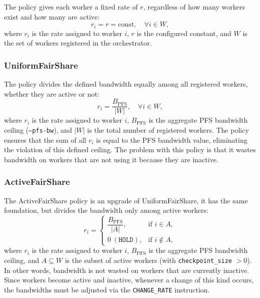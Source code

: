 \documentclass[sigplan,twocolumn,10pt,nonacm]{acmart}
\begin{document}
The policy gives each worker a fixed rate of $r$, regardless of how many workers exist and how many are active:
\begin{equation}
    r_i = r = \text{const}, \quad \forall i \in W,
    \label{eq:fixed-rate}
\end{equation}
where $r_i$ is the rate assigned to worker $i$, $r$ is the configured constant, and $W$ is the set of workers registered in the orchestrator.

\subsubsection{UniformFairShare}
\label{sec:policy-uniform}

The policy divides the defined bandwidth equally among all registered workers, whether they are active or not:
\begin{equation}
    r_i = \frac{B_{\text{PFS}}}{|W|}, \quad \forall i \in W,
    \label{eq:uniform-fair-share}
\end{equation}
where $r_i$ is the rate assigned to worker $i$, $B_{\text{PFS}}$ is the aggregate PFS bandwidth ceiling (\texttt{--pfs-bw}), and $|W|$ is the total number of registered workers. The policy ensures that the sum of all $r_i$ is equal to the PFS bandwidth value, eliminating the violation of this defined ceiling. The problem with this policy is that it wastes bandwidth on workers that are not using it because they are inactive.
\subsubsection{ActiveFairShare}
\label{sec:policy-active}

The ActiveFairShare policy is an upgrade of UniformFairShare, it has the same foundation, but divides the bandwidth only among active workers:
\begin{equation}
    r_i =
    \begin{cases}
        \dfrac{B_{\text{PFS}}}{|A|}, & \text{if } i \in A, \\[6pt]
        0 \ (\texttt{HOLD}),         & \text{if } i \notin A,
    \end{cases}
    \label{eq:active-fair-share}
\end{equation}
where $r_i$ is the rate assigned to worker $i$, $B_{\text{PFS}}$ is the aggregate PFS bandwidth ceiling, and $A \subseteq W$ is the subset of active workers (with \texttt{checkpoint\_size} $> 0$). In other words, bandwidth is not wasted on workers that are currently inactive. Since workers become active and inactive, whenever a change of this kind occurs, the bandwidths must be adjusted via the \texttt{CHANGE\_RATE} instruction.
\end{document}
